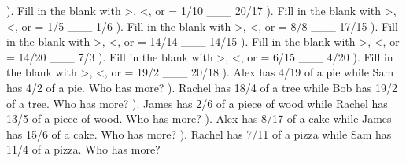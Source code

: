 \documentclass{article}%
\begin{document}
\newline%
). Fill in the blank with >, <, or = 1/10 \_\_\_ 20/17%
\newline%
\newline%
). Fill in the blank with >, <, or = 1/5 \_\_\_ 1/6%
\newline%
\newline%
). Fill in the blank with >, <, or = 8/8 \_\_\_ 17/15%
\newline%
\newline%
). Fill in the blank with >, <, or = 14/14 \_\_\_ 14/15%
\newline%
\newline%
). Fill in the blank with >, <, or = 14/20 \_\_\_ 7/3%
\newline%
\newline%
). Fill in the blank with >, <, or = 6/15 \_\_\_ 4/20%
\newline%
\newline%
). Fill in the blank with >, <, or = 19/2 \_\_\_ 20/18%
\newline%
\newline%
). Alex has 4/19 of a pie while Sam has 4/2 of a pie. Who has more?%
\newline%
\newline%
). Rachel has 18/4 of a tree while Bob has 19/2 of a tree. Who has more?%
\newline%
\newline%
). James has 2/6 of a piece of wood while Rachel has 13/5 of a piece of wood. Who has more?%
\newline%
\newline%
). Alex has 8/17 of a cake while James has 15/6 of a cake. Who has more?%
\newline%
\newline%
). Rachel has 7/11 of a pizza while Sam has 11/4 of a pizza. Who has more?%
\newline%
\newline%
\end{document}
